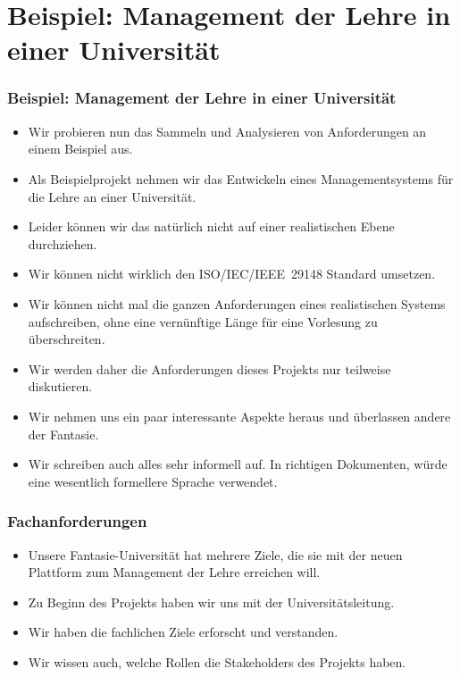 \documentclass[aspectratio=169,mathserif,notheorems]{beamer}%
\begin{document}
\section{Beispiel: Management der Lehre in einer Universität}%
%
\begin{frame}%
\frametitle{Beispiel: Management der Lehre in einer Universität}%
\begin{itemize}%
\item Wir probieren nun das Sammeln und Analysieren von Anforderungen an einem Beispiel aus.%
%
\item<2-> Als Beispielprojekt nehmen wir das Entwickeln eines Managementsystems für die Lehre an einer Universität.%
%
\item<3-> Leider können wir das natürlich nicht auf einer realistischen Ebene durchziehen.%
%
\item<4-> Wir können nicht wirklich den ISO/IEC/IEEE~29148 Standard\cite{ISOIECIEEE2018SASELCPRE} umsetzen.%
%
\item<5-> Wir können nicht mal die ganzen Anforderungen eines realistischen Systems aufschreiben, ohne eine vernünftige Länge für eine Vorlesung zu überschreiten.%
%
\item<6-> Wir werden daher die Anforderungen dieses Projekts nur teilweise diskutieren.%
%
\item<7-> Wir nehmen uns ein paar interessante Aspekte heraus und überlassen andere der Fantasie.%
%
\item<8-> Wir schreiben auch alles sehr informell auf. In richtigen Dokumenten, würde eine wesentlich formellere Sprache verwendet.%
\end{itemize}%
\end{frame}%
%
\begin{frame}%
\frametitle{Fachanforderungen}%
\begin{itemize}%
\item Unsere Fantasie-Universität hat mehrere Ziele, die sie mit der neuen Plattform zum Management der Lehre erreichen will.%
%
\item<2-> Zu Beginn des Projekts haben wir uns mit der Universitätsleitung.%
%
\item<3-> Wir haben die fachlichen Ziele erforscht und verstanden.%
%
\item<4-> Wir wissen auch, welche Rollen die Stakeholders des Projekts haben.%
%
\end{itemize}%
\end{frame}%
%
\end{document}
